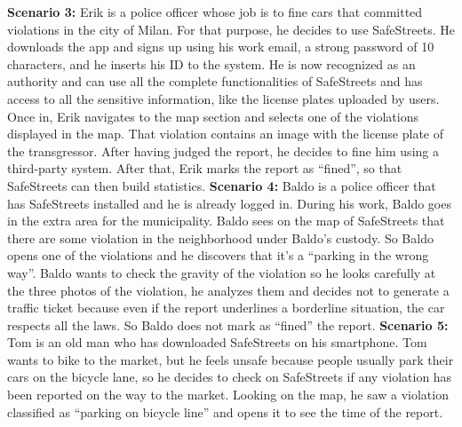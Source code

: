 \documentclass[../RASD.tex]{subfiles}
\begin{document}
                \newline
                \newline
                \textbf{Scenario 3:} Erik is a police officer whose job is to fine cars that committed violations in the city of Milan.
                For that purpose, he decides to use SafeStreets.
                He downloads the app and signs up using his work email, a strong password of 10 characters, and he inserts his ID to the system.
                He is now recognized as an authority and can use all the complete functionalities of SafeStreets and has access to all the sensitive information,
                like the license plates uploaded by users.
                Once in, Erik navigates to the map section and selects one of the violations displayed in the map.
                That violation contains an image with the license plate of the transgressor.
                After having judged the report, he decides to fine him using a third-party system.
                After that, Erik marks the report as “fined”, so that SafeStreets can then build statistics.
                \newline
                \newline
                \textbf{Scenario 4:} Baldo is a police officer that has SafeStreets installed and he is already logged in.
                During his work, Baldo goes in the extra area for the municipality.
                Baldo sees on the map of SafeStreets that there are some violation in the neighborhood under Baldo’s custody.
                So Baldo opens one of the violations and he discovers that it’s a “parking in the wrong way”.
                Baldo wants to check the gravity of the violation so he looks carefully at the three photos of the violation,
                he analyzes them and decides not to generate a traffic ticket because even if the report underlines a borderline situation,
                the car respects all the laws.
                So Baldo does not mark as “fined” the report.
                \newline
                \newline
                \textbf{Scenario 5:} Tom is an old man who has downloaded SafeStreets on his smartphone.
                Tom wants to bike to the market, but he feels unsafe because people usually park their cars on the bicycle lane,
                so he decides to check on SafeStreets if any violation has been reported on the way to the market.
                Looking on the map, he saw a violation classified as “parking on bicycle line” and opens it to see the time of the report.
\end{document}
